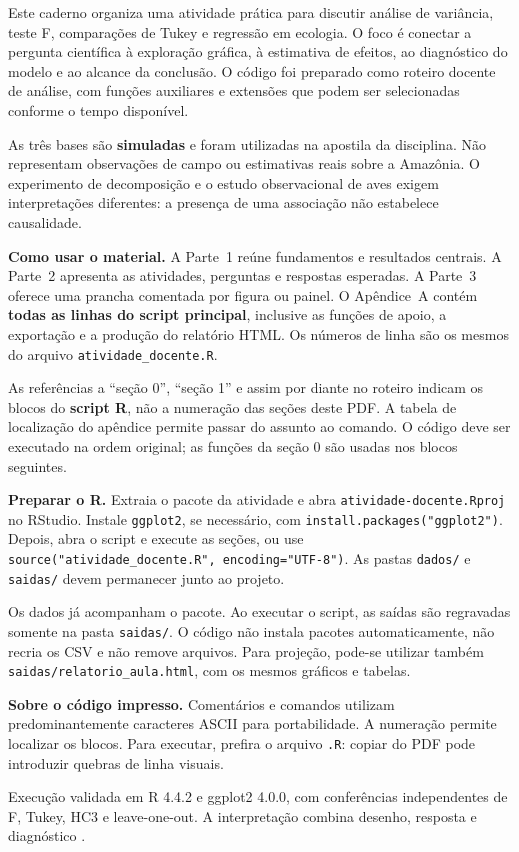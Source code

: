 Este caderno organiza uma atividade prática para discutir análise de variância, teste F, comparações de Tukey e regressão em ecologia. O foco é conectar a pergunta científica à exploração gráfica, à estimativa de efeitos, ao diagnóstico do modelo e ao alcance da conclusão. O código foi preparado como roteiro docente de análise, com funções auxiliares e extensões que podem ser selecionadas conforme o tempo disponível.

\begin{atencao}
As três bases são \textbf{simuladas} e foram utilizadas na apostila da disciplina. Não representam observações de campo ou estimativas reais sobre a Amazônia. O experimento de decomposição e o estudo observacional de aves exigem interpretações diferentes: a presença de uma associação não estabelece causalidade.
\end{atencao}

\textbf{Como usar o material.} A Parte~1 reúne fundamentos e resultados centrais. A Parte~2 apresenta as atividades, perguntas e respostas esperadas. A Parte~3 oferece uma prancha comentada por figura ou painel. O Apêndice~A contém \textbf{todas as linhas do script principal}, inclusive as funções de apoio, a exportação e a produção do relatório HTML. Os números de linha são os mesmos do arquivo \texttt{atividade\_docente.R}.

As referências a ``seção 0'', ``seção 1'' e assim por diante no roteiro indicam os blocos do \textbf{script R}, não a numeração das seções deste PDF. A tabela de localização do apêndice permite passar do assunto ao comando. O código deve ser executado na ordem original; as funções da seção 0 são usadas nos blocos seguintes.

\textbf{Preparar o R.} Extraia o pacote da atividade e abra \texttt{atividade-docente.Rproj} no RStudio. Instale \texttt{ggplot2}, se necessário, com \texttt{install.packages("ggplot2")}. Depois, abra o script e execute as seções, ou use \texttt{source("atividade\_docente.R", encoding="UTF-8")}. As pastas \texttt{dados/} e \texttt{saidas/} devem permanecer junto ao projeto.

Os dados já acompanham o pacote. Ao executar o script, as saídas são regravadas somente na pasta \texttt{saidas/}. O código não instala pacotes automaticamente, não recria os CSV e não remove arquivos. Para projeção, pode-se utilizar também \texttt{saidas/relatorio\_aula.html}, com os mesmos gráficos e tabelas.

\textbf{Sobre o código impresso.} Comentários e comandos utilizam predominantemente caracteres ASCII para portabilidade. A numeração permite localizar os blocos. Para executar, prefira o arquivo \texttt{.R}: copiar do PDF pode introduzir quebras de linha visuais.

Execução validada em R 4.4.2 e ggplot2 4.0.0, com conferências independentes de F, Tukey, HC3 e leave-one-out. A interpretação combina desenho, resposta e diagnóstico \parencite{quinn2002,zuur2010,wasserstein2016}.
